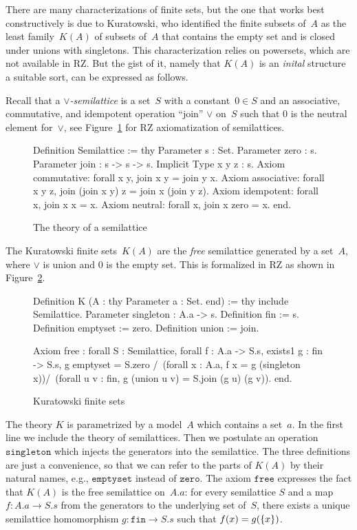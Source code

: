 There are many characterizations of finite sets, but the one that
works best constructively is due to Kuratowski, who identified the
finite subsets of~$A$ as the least family~$K(A)$ of subsets of~$A$
that contains the empty set and is closed under unions with
singletons. This characterization relies on powersets, which are not
available in RZ. But the gist of it, namely that $K(A)$ is an
\emph{inital} structure a suitable sort, can be expressed as follows.

Recall that a \emph{$\vee$-semilattice} is a set~$S$ with a
constant~$0 \in S$ and an associative, commutative, and idempotent
operation ``join'' $\vee$ on~$S$ such that $0$ is the neutral element
for~$\vee$, see Figure~\ref{fig:semilattice} for RZ axiomatization of
semilattices.
%
\begin{figure}
  \centering
\begin{source}
Definition Semilattice :=
thy
  Parameter s : Set.
  Parameter zero : s.
  Parameter join : s -> s -> s.
  Implicit Type x y z : s.
  Axiom commutative: forall x y,   join x y = join y x.
  Axiom associative: forall x y z, join (join x y) z = join x (join y z).
  Axiom idempotent:  forall x,     join x x = x.
  Axiom neutral:     forall x,     join x zero = x.
end.
\end{source}
  \caption{The theory of a semilattice}
  \label{fig:semilattice}
\end{figure}
%
The Kuratowski finite sets~$K(A)$ are the \emph{free} semilattice
generated by a set~$A$, where $\vee$ is union and $0$ is the empty
set. This is formalized in RZ as shown in Figure~\ref{fig:kuratowski}.
%
\begin{figure}
\centering
\begin{source}
Definition K (A : thy 
                Parameter a : Set.
              end) :=
thy
  include Semilattice.
  Parameter singleton : A.a -> s.
  Definition fin := s.
  Definition emptyset := zero.
  Definition union := join.

  Axiom free :
    forall S : Semilattice, forall f : A.a -> S.s,
    exists1 g : fin -> S.s, 
      g emptyset = S.zero /\
        (forall x : A.a, f x = g (singleton x))/\
        (forall u v : fin, g (union u v) = S.join (g u) (g v)).
end.
\end{source}
  \caption{Kuratowski finite sets}
  \label{fig:kuratowski}
\end{figure}
%
The theory $K$ is parametrized by a model~$A$ which contains a
set~$a$. In the first line we include the theory of semilattices. Then
we postulate an operation $\mathtt{singleton}$ which injects the
generators into the semilattice. The three definitions are just a
convenience, so that we can refer to the parts of $K(A)$ by their
natural names, e.g., $\mathtt{emptyset}$ instead of $\mathtt{zero}$.
The axiom $\mathtt{free}$ expresses the fact that $K(A)$ is the free
semilattice on~$A.a$: for every semilattice $S$ and a map $f : A.a \to
S.s$ from the generators to the underlying set of~$S$, there exists a
unique semilattice homomorphism $g : \mathtt{fin} \to S.s$ such that
$f(x) = g(\{x\})$.

